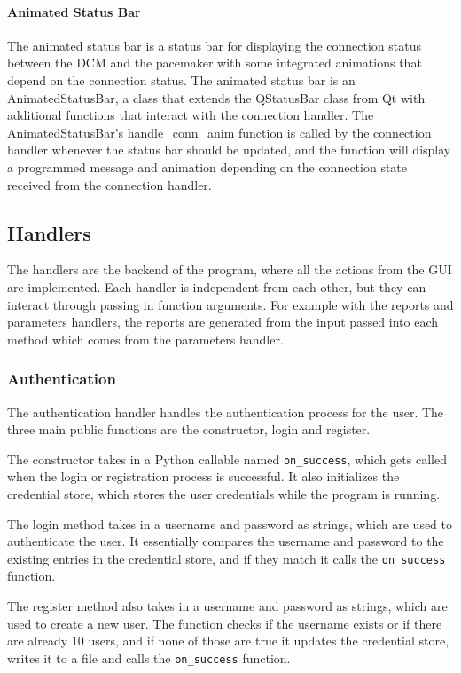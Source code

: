\documentclass[12pt]{article}
\begin{document}
\paragraph{Animated Status Bar}
The animated status bar is a status bar for displaying the connection status between the DCM and the pacemaker with some integrated animations that depend on the connection status. The animated status bar is an AnimatedStatusBar, a class that extends the QStatusBar class from Qt with additional functions that interact with the connection handler. The AnimatedStatusBar's handle\_conn\_anim function is called by the connection handler whenever the status bar should be updated, and the function will display a programmed message and animation depending on the connection state received from the connection handler.

\subsection{Handlers}
The handlers are the backend of the program, where all the actions from the GUI are implemented. Each handler is independent from each other, but they can interact through passing in function arguments. For example with the reports and parameters handlers, the reports are generated from the input passed into each method which comes from the parameters handler.

\subsubsection{Authentication}
The authentication handler handles the authentication process for the user. The three main public functions are the constructor, login and register.

The constructor takes in a Python callable named \verb|on_success|, which gets called when the login or registration process is successful.
It also initializes the credential store, which stores the user credentials while the program is running.

The login method takes in a username and password as strings, which are used to authenticate the user. It essentially compares the username and password to the existing entries in the credential store, and if they match it calls the \verb|on_success| function.

The register method also takes in a username and password as strings, which are used to create a new user. The function checks if the username exists or if there are already 10 users, and if none of those are true it updates the credential store, writes it to a file and calls the \verb|on_success| function.
\end{document}
